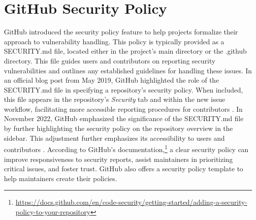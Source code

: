 \section{GitHub Security Policy}



\label{2_background}



GitHub introduced the security policy feature to help projects formalize their approach to vulnerability handling. This policy is typically provided as a SECURITY.md file, located either in the project’s main directory or the .github directory. This file guides users and contributors on reporting security vulnerabilities and outlines any established guidelines for handling these issues. In an official blog post from May 2019, GitHub highlighted the role of the SECURITY.md file in specifying a repository's security policy. When included, this file appears in the repository’s \textit{Security} tab and within the new issue workflow, facilitating more accessible reporting procedures for contributors \cite{githubSecurityPolicy2019}. In November 2022, GitHub emphasized the significance of the SECURITY.md file by further highlighting the security policy on the repository overview in the sidebar. This adjustment further emphasizes its accessibility to users and contributors \cite{githubSecurityPolicy2022}. According to GitHub’s documentation,\footnote{\url{https://docs.github.com/en/code-security/getting-started/adding-a-security-policy-to-your-repository}
} a clear security policy can improve responsiveness to security reports, assist maintainers in prioritizing critical issues, and foster trust. GitHub also offers a security policy template to help maintainers create their policies. 






